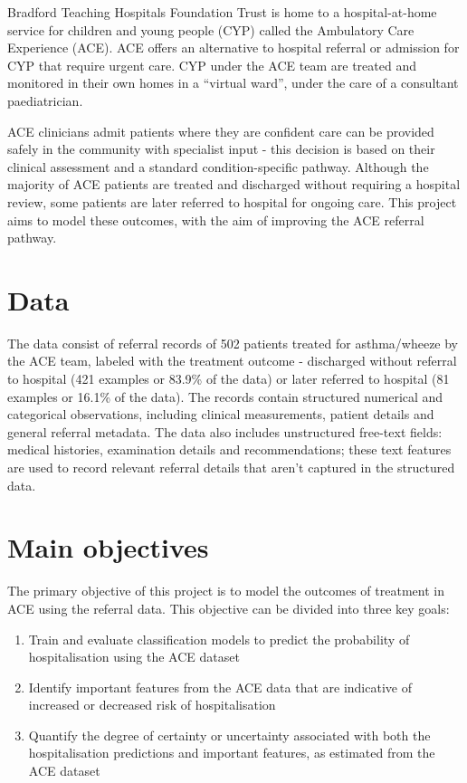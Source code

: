 Bradford Teaching Hospitals Foundation Trust is home to a hospital-at-home service for children and young people (CYP) called the Ambulatory Care Experience (ACE).
ACE offers an alternative to hospital referral or admission for CYP that require urgent care.
CYP under the ACE team are treated and monitored in their own homes in a ``virtual ward'', under the care of a consultant paediatrician.

ACE clinicians admit patients where they are confident care can be provided safely in the community with specialist input - this decision is based on their clinical assessment and a standard condition-specific pathway.
Although the majority of ACE patients are treated and discharged without requiring a hospital review, some patients are later referred to hospital for ongoing care.
This project aims to model these outcomes, with the aim of improving the ACE referral pathway.

\section*{Data}\label{sec:data}

The data consist of referral records of 502 patients treated for asthma/wheeze by the ACE team, labeled with the treatment outcome - discharged without referral to hospital (421 examples or 83.9\% of the data) or later referred to hospital (81 examples or 16.1\% of the data).
The records contain structured numerical and categorical observations, including clinical measurements, patient details and general referral metadata.
The data also includes unstructured free-text fields: medical histories, examination details and recommendations;
these text features are used to record relevant referral details that aren't captured in the structured
data.

\section*{Main objectives}\label{sec:main-objectives}

The primary objective of this project is to model the outcomes of treatment in ACE using the referral data.
This objective can be divided into three key goals:

\begin{enumerate}
    \item Train and evaluate classification models to predict the probability of hospitalisation using the ACE dataset
    \item Identify important features from the ACE data that are
    indicative of increased or decreased risk of hospitalisation
    \item Quantify the degree of certainty or uncertainty associated with
    both the hospitalisation predictions and important features, as
    estimated from the ACE dataset
\end{enumerate}


